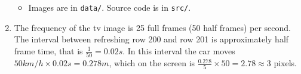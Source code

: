 \documentclass[a4paper,11pt]{article}
\begin{document}
\begin{enumerate}
\begin{itemize}
    \item Images are in \texttt{data/}. Source code is in \texttt{src/}.  
  \end{itemize}
  
  \item The frequency of the tv image is 25 full frames (50 half frames) per second. The interval between refreshing row 200 and row 201 is approximately half frame time, that is $ \frac{1}{50} = 0.02 s $. In this interval the car moves $ 50km/h \times 0.02s = 0.278m $, which on the screen is $ \frac{0.278}{5} \times 50 = 2.78 \approx 3 $ pixels.
\end{enumerate}
\end{document}
